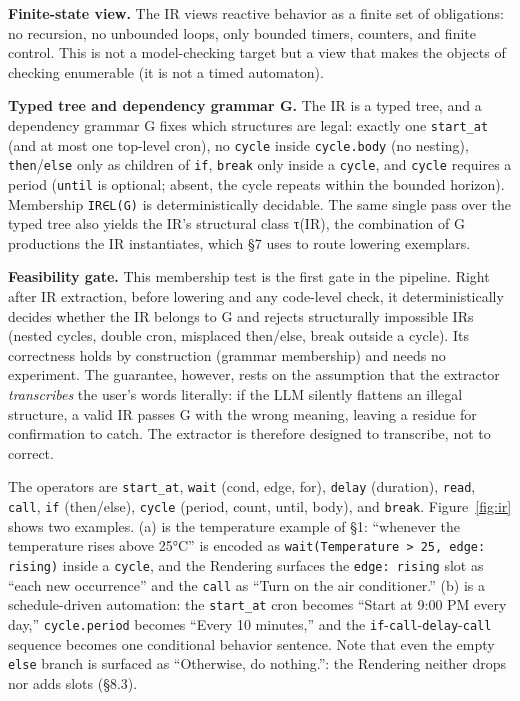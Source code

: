 \documentclass[sigconf,nonacm,anonymous,review]{acmart}
\begin{document}
\textbf{Finite-state view.} The IR views reactive behavior as a finite set of obligations: no recursion, no unbounded loops, only bounded timers, counters, and finite control. This is not a model-checking target but a view that makes the objects of checking enumerable (it is not a timed automaton).

\textbf{Typed tree and dependency grammar G.} The IR is a typed tree, and a dependency grammar G fixes which structures are legal: exactly one \texttt{start\_at} (and at most one top-level cron), no \texttt{cycle} inside \texttt{cycle.body} (no nesting), \texttt{then}/\texttt{else} only as children of \texttt{if}, \texttt{break} only inside a \texttt{cycle}, and \texttt{cycle} requires a period (\texttt{until} is optional; absent, the cycle repeats within the bounded horizon). Membership \texttt{IR∈L(G)} is deterministically decidable. The same single pass over the typed tree also yields the IR's structural class τ(IR), the combination of G productions the IR instantiates, which \S7 uses to route lowering exemplars.

\textbf{Feasibility gate.} This membership test is the first gate in the pipeline. Right after IR extraction, before lowering and any code-level check, it deterministically decides whether the IR belongs to G and rejects structurally impossible IRs (nested cycles, double cron, misplaced then/else, break outside a cycle). Its correctness holds by construction (grammar membership) and needs no experiment. The guarantee, however, rests on the assumption that the extractor \emph{transcribes} the user's words literally: if the LLM silently flattens an illegal structure, a valid IR passes G with the wrong meaning, leaving a residue for confirmation to catch. The extractor is therefore designed to transcribe, not to correct.

The operators are \texttt{start\_at}, \texttt{wait} (cond, edge, for), \texttt{delay} (duration), \texttt{read}, \texttt{call}, \texttt{if} (then/else), \texttt{cycle} (period, count, until, body), and \texttt{break}. Figure~\ref{fig:ir} shows two examples. (a) is the temperature example of \S1: ``whenever the temperature rises above 25°C'' is encoded as \texttt{wait(Temperature > 25, edge: rising)} inside a \texttt{cycle}, and the Rendering surfaces the \texttt{edge: rising} slot as ``each new occurrence'' and the \texttt{call} as ``Turn on the air conditioner.'' (b) is a schedule-driven automation: the \texttt{start\_at} cron becomes ``Start at 9:00 PM every day,'' \texttt{cycle.period} becomes ``Every 10 minutes,'' and the \texttt{if}-\texttt{call}-\texttt{delay}-\texttt{call} sequence becomes one conditional behavior sentence. Note that even the empty \texttt{else} branch is surfaced as ``Otherwise, do nothing.'': the Rendering neither drops nor adds slots (\S8.3).
\end{document}
